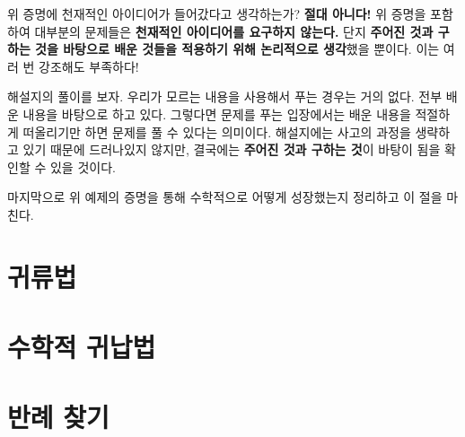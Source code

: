 
위 증명에 천재적인 아이디어가 들어갔다고 생각하는가? \textbf{절대 아니다!} 위 증명을 포함하여 대부분의 문제들은 \textbf{천재적인 아이디어를 요구하지 않는다.} 단지 \textbf{주어진 것과 구하는 것을 바탕으로 배운 것들을 적용하기 위해 논리적으로 생각}했을 뿐이다. 이는 여러 번 강조해도 부족하다!

해설지의 풀이를 보자. 우리가 모르는 내용을 사용해서 푸는 경우는 거의 없다. 전부 배운 내용을 바탕으로 하고 있다. 그렇다면 문제를 푸는 입장에서는 배운 내용을 적절하게 떠올리기만 하면 문제를 풀 수 있다는 의미이다. 해설지에는 사고의 과정을 생략하고 있기 때문에 드러나있지 않지만, 결국에는 \textbf{주어진 것과 구하는 것}이 바탕이 됨을 확인할 수 있을 것이다.

마지막으로 위 예제의 증명을 통해 수학적으로 어떻게 성장했는지 정리하고 이 절을 마친다.


\pagebreak







\section{귀류법}

\section{수학적 귀납법}

\section{반례 찾기}

